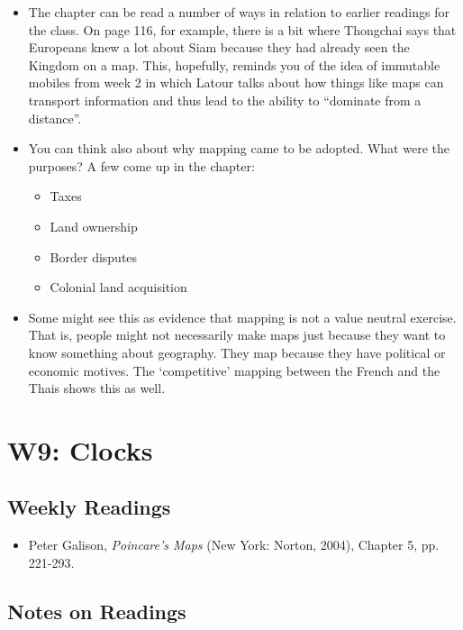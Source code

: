 \documentclass[a4paper]{article}
\begin{document}
\begin{itemize}
	\item The chapter can be read a number of ways in relation to earlier readings for the class. On page 116, for example, there is a bit where Thongchai says that Europeans knew a lot about Siam because they had already seen the Kingdom on a map. This, hopefully, reminds you of the idea of immutable mobiles from week 2 in which Latour talks about how things like maps can transport information and thus lead to the ability to ``dominate from a distance''.
	\item You can think also about why mapping came to be adopted. What were the purposes? A few come up in the chapter:
	\begin{itemize}[label=$\circ$]
		\item Taxes
		\item Land ownership
		\item Border disputes
		\item Colonial land acquisition
	\end{itemize}
	\item Some might see this as evidence that mapping is not a value neutral exercise. That is, people might not necessarily make maps just because they want to know something about geography. They map because they have political or economic motives. The `competitive' mapping between the French and the Thais shows this as well.
\end{itemize}

\newpage
\section{W9: Clocks}
\subsection*{Weekly Readings}
\begin{itemize}
	\item Peter Galison, \textit{Poincare’s Maps} (New York: Norton, 2004), Chapter 5, pp. 221-293.
\end{itemize}

\subsection{Notes on Readings}
\end{document}
